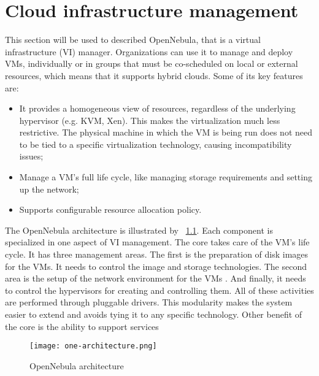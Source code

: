 \chapter{\textbf{Cloud infrastructure management}}


This section will be used to described OpenNebula, that is a virtual infrastructure (VI) manager. Organizations can use it to manage and deploy VMs, individually or in groups that must be co-scheduled on local or external resources, which means that it supports hybrid clouds. Some of its key features are:
\begin{itemize}
 \item It provides a homogeneous view of resources, regardless of the underlying hypervisor (e.g. KVM, Xen). This makes the virtualization much less restrictive. The physical machine in which the VM is being run does not need to be tied to a specific virtualization technology, causing incompatibility issues;
  \item Manage a VM's full life cycle, like managing storage requirements and setting up the network;
  \item Supports configurable resource allocation policy.
\end{itemize}

The OpenNebula architecture is illustrated by ~\ref{fig:open_arch}. Each component is specialized in one aspect of VI management. The core takes care of the VM's life cycle. It has three management areas. The first is the preparation of disk images for the VMs. It needs to control the image and storage technologies. The second area is the setup of the network environment for the VMs . And finally, it needs to control the hypervisors for creating and controlling them. All of these activities are performed through pluggable drivers. This modularity makes the system easier to extend and avoids tying it to any specific technology. Other benefit of the core is the ability to support services	




\begin{figure}[ht]
  \centering
 \texttt{[image: one-architecture.png]}
  \caption{OpenNebula architecture}
  \label{fig:open_arch}
\end{figure}








